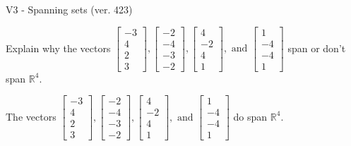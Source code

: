 \begin{exercise}
  \begin{exerciseTitle}V3 - Spanning sets (ver. 423)\end{exerciseTitle}
  \begin{exerciseStatement}
    Explain why the vectors \(\left[\begin{array}{r}
-3 \\
4 \\
2 \\
3
\end{array}\right] , \left[\begin{array}{r}
-2 \\
-4 \\
-3 \\
-2
\end{array}\right] , \left[\begin{array}{r}
4 \\
-2 \\
4 \\
1
\end{array}\right] , \text{ and } \left[\begin{array}{r}
1 \\
-4 \\
-4 \\
1
\end{array}\right]\) span or don't span \(\mathbb{R}^4\). 
	


  \end{exerciseStatement}
  \begin{exerciseAnswer}
   The vectors \(\left[\begin{array}{r}
-3 \\
4 \\
2 \\
3
\end{array}\right] , \left[\begin{array}{r}
-2 \\
-4 \\
-3 \\
-2
\end{array}\right] , \left[\begin{array}{r}
4 \\
-2 \\
4 \\
1
\end{array}\right] , \text{ and } \left[\begin{array}{r}
1 \\
-4 \\
-4 \\
1
\end{array}\right]\) 
  	 do  
	span \(\mathbb{R}^4\).
  


  \end{exerciseAnswer}
\end{exercise}